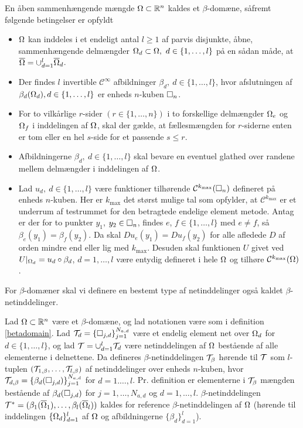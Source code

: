 \begin{definition} \label{betadomain}
En åben sammenhængende mængde $\Omega\subset\mathbb{R}^n$ kaldes et
$\beta$-do\-mæ\-ne, såfremt følgende betingelser er opfyldt
\begin{itemize}
  \item $\Omega$ kan inddeles i et endeligt antal $l\geq 1$ af parvis
        disjunkte, åbne, sammenhængende delmængder $\Omega_d\subset\Omega , \
        d\in\{1,\ldots,l\}$ på en sådan måde, at $\overline{\Omega} =
        \cup_{d=1}^{l}\overline{\Omega}_d$. 
  \item Der findes $l$ invertible ${\mathcal C}^\infty$ afbildninger
        $\beta_d, \ d\in\{1,\ldots,l\}$, hvor afslutningen af
        $\beta_d(\Omega_d), d\in\{1,\ldots,l\}$ er enheds $n$-kuben $\Box_n$.
  \item For to vilkårlige $r$-sider $(r\in\{ 1,\ldots ,n\})$ i to 
        forskellige delmængder $\Omega_e$ og $\Omega_f$ i inddelingen af $\Omega$,
        skal der gælde, at fællesmængden for $r$-siderne enten er tom eller en
        hel $s$-side for et passende $s\leq r$.
  \item Afbildningerne $\beta_d, \ d\in\{1,\ldots,l\}$ skal bevare en
        eventuel glathed over randene mellem delmængder i inddelingen af $\Omega$.
  \item Lad $u_d, \ d\in\{1,\ldots,l\}$ være funktioner tilhørende
        ${\mathcal C}^{k_{\max}}(\Box_n)$ defineret på enheds $n$-kuben. Her er 
        $k_{\max}$ det størst mulige tal som opfylder, at ${\mathcal C}^{k_{\max}}$ er
        et underrum af testrummet for den betragtede endelige element metode.
        Antag er der for to punkter $y_1$, $y_2\in\Box_n$, findes $e$,
        $f\in\{ 1, \ldots ,l\}$ med $e\not = f$, så $\beta_e (y_1)=\beta_f (y_2)$. 
        Da skal $Du_e(y_1)=Du_f(y_2)$ for alle afledede $D$ af orden mindre end eller
        lig med $k_{\max}$. Desuden skal funktionen $U$ givet ved
        $U|_{\Omega_d}=u_d \circ \beta_d$, $d=1,\ldots,l$ være entydig
        defineret i hele $\Omega$ og tilhøre ${\mathcal C}^{k_{\max}}(\Omega)$.  
\end{itemize}
\end{definition}
For $\beta$-domæner skal vi definere en bestemt type af netinddelinger
også kaldet $\beta$-netinddelinger.
\begin{definition} \label{betamesh}
Lad $\Omega\subset\mathbb{R}^n$ være et $\beta$-domæne, og lad notationen være
som i definition \ref{betadomain}. Lad $\mathcal T_d
=\{\Box_{j,d}\}_{j=1}^{N_{a,d}}$ være et endelig element net over
$\Omega_d$ for $d\in\{1,\ldots,l\}$, og lad $\mathcal T=\cup_{d=1}^l \mathcal T_d$ være
netinddelingen af $\Omega$ bestående af alle ele\-menterne i delnettene.
Da defineres $\beta$-netinddelingen $\mathcal T_\beta$ hørende til $\mathcal T$ som
$l$-tuplen $(\mathcal T_{1,\beta},\ldots ,\mathcal T_{l,\beta})$ af netinddelinger
over enheds $n$-kuben, hvor
$\mathcal T_{d,\beta}=\{\beta_d(\Box_{j,d})\}_{j=1}^{N_{a,d}}$ for $d=1.\ldots
,l$. Pr. definition er elementerne i $\mathcal T_\beta$ mængden bestående af
$\beta_d(\Box_{j,d})$ for $j=1,\ldots ,N_{a,d}$ og $d=1,\ldots ,l$.
$\beta$-netinddelingen $\mathcal T^{\ast}=(\beta_1(\overline{\Omega}_1),\ldots
,\beta_l(\overline{\Omega}_l))$ kaldes for reference
$\beta$-netinddelingen af $\Omega$ (hørende til inddelingen
$\{\Omega_d\}_{d=1}^l$ af $\Omega$ og afbildningerne $\{\beta_d\}_{d=1}^l$).  
\end{definition}
